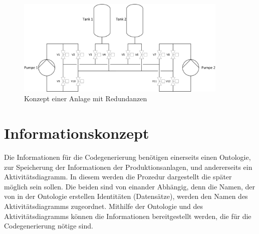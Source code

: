 

\begin{figure}[h!]
		\centering
		\includegraphics[width=0.9\textwidth]{graphics/konzept/RI_K.jpg}
		\caption{Konzept einer Anlage mit Redundanzen}
\end{figure}
\section{Informationskonzept}
Die Informationen für die Codegenerierung benötigen einerseits einen Ontologie, zur Speicherung der Informationen der Produktionsanlagen,  und andererseits ein Aktivitätsdiagramm. In diesem werden die Prozedur dargestellt die später möglich sein sollen.
Die beiden sind von einander Abhängig, denn die Namen, der von in der Ontologie erstellen Identitäten (Datensätze), werden den Namen des Aktivitätsdiagramms zugeordnet.
Mithilfe der Ontologie und des Aktivitätsdiagramms können die Informationen bereitgestellt werden, die für die Codegenerierung nötige sind.  

